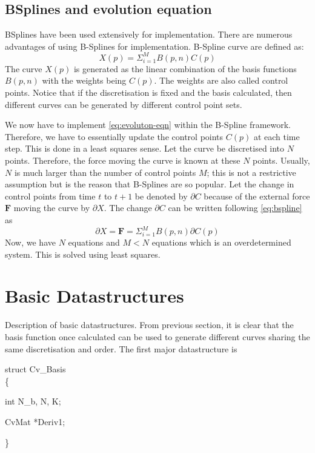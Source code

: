 \documentclass[12pt,a4paper]{article}
\begin{document}
\subsection{BSplines and evolution equation}
BSplines have been used extensively for implementation. There are
numerous advantages of using B-Splines for implementation. B-Spline
curve are defined as:
\begin{equation}\label{eq:bspline}
X(p) = \Sigma_{i=1}^M B(p,n) C(p) 
\end{equation}
The curve $X(p)$ is generated as the linear combination of the basis
functions $B(p,n)$ with the weights being $C(p)$. The weights are also
called control points. Notice that if the discretisation is fixed and
the basis calculated, then different curves can be generated by
different control point sets. 

We now have to implement \ref{eq:evoluton-eqn} within the B-Spline
framework. Therefore, we have to essentially update the control points
$C(p)$ at each time step. This is done in a least squares sense. Let
the curve be discretised into $N$ points. Therefore, the force moving
the curve is known at these $N$ points. Usually, $N$ is much larger
than the number of control points $M$; this is not a restrictive
assumption but is the reason that B-Splines are so popular. Let the
change in control points from time $t$ to $t+1$ be denoted by
$\partial C$ because of the external force $\mathbf{F}$ moving the
curve by $\partial X$. The change
$\partial C$ can be written following \ref{eq:bspline} as
\begin{equation}
\partial X = \mathbf F = \Sigma_{i=1}^M B(p,n)\partial C(p)
\end{equation}
Now, we have $N$ equations and $M < N$ equations which is an
overdetermined system. This is solved using least squares.
\section{Basic Datastructures}
Description of basic datastructures. From previous section, it is
clear that the basis function once calculated can be used to generate
different curves sharing the same discretisation and order. The first
major datastructure is 

struct Cv\_Basis\\
\{

int N\_b, N, K;

CvMat *Deriv1;

\}
\end{document}
